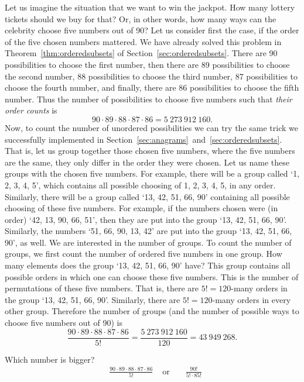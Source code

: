 Let us imagine the situation that we want to win the jackpot. 
How many lottery tickets should we buy for that? 
Or, in other words, 
how many ways can the celebrity choose five numbers out of 90? 
Let us consider first the case, 
if the order of the five chosen numbers mattered. 
We have already solved this problem in Theorem~\ref{thm:orderedsubsets} of Section~\ref{sec:orderedsubsets}. 
There are 90 possibilities to choose the first number, 
then there are 89 possibilities to choose the second number, 
88 possibilities to choose the third number, 
87 possibilities to choose the fourth number, 
and finally, 
there are 86 possibilities to choose the fifth number. 
Thus the number of possibilities to choose five numbers such that \emph{their order counts} is
\[
90 \cdot 89 \cdot 88 \cdot 87 \cdot 86 = 5~273~912~160. 
\]
Now, to count the number of unordered possibilities we can try the same trick we successfully implemented in Section~\ref{sec:anagrams}~and~\ref{sec:orderedsubsets}.
That is, 
let us group together those chosen five numbers, 
where the five numbers are the same, 
they only differ in the order they were chosen. 
Let us name these groups with the chosen five numbers. 
For example, 
there will be a group called `1, 2, 3, 4, 5', 
which contains all possible choosing of 1, 2, 3, 4, 5, in any order. 
Similarly, 
there will be a group called `13, 42, 51, 66, 90' containing all possible choosing of these five numbers. 
For example, if the numbers chosen were (in order) `42, 13, 90, 66, 51', 
then they are put into the group `13, 42, 51, 66, 90'. 
Similarly, the numbers `51, 66, 90, 13, 42' are put into the group `13, 42, 51, 66, 90', as well. 
We are interested in the number of groups. 
To count the number of groups, 
we first count the number of ordered five numbers in one group. 
How many elements does the group `13, 42, 51, 66, 90' have? 
This group contains all possible orders in which one can choose these five numbers. 
This is the number of permutations of these five numbers. 
That is, there are $5! = 120$-many orders in the group `13, 42, 51, 66, 90'. 
Similarly, there are $5! = 120$-many orders in every other group. 
Therefore the number of groups (and the number of possible ways to choose five numbers out of 90) is
\[
\frac{90 \cdot 89 \cdot 88 \cdot 87 \cdot 86}{5!} = \frac{5~273~912~160}{120} = 43~949~268. 
\]

\begin{exercise}\label{ex:90choose5}
Which number is bigger? 
\begin{align*}
&\frac{90 \cdot 89 \cdot 88 \cdot 87 \cdot 86}{5!} &\text{ or }& &\frac{90!}{5! \cdot 85!} 
\end{align*}
\end{exercise}

